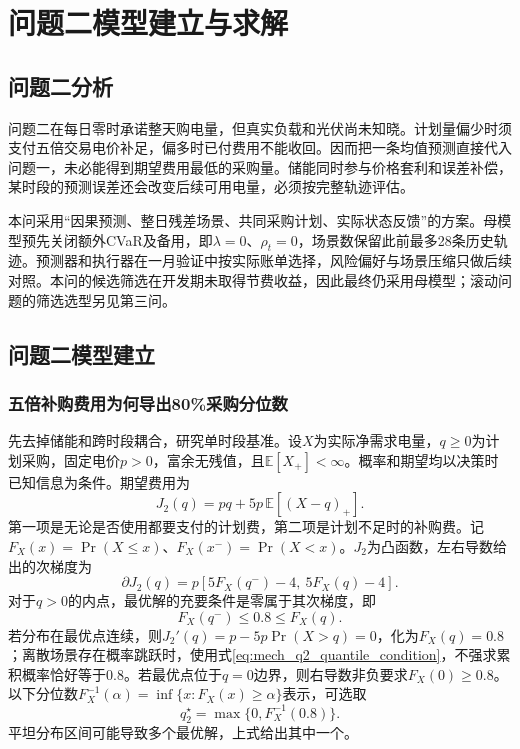 \section{问题二模型建立与求解}

\subsection{问题二分析}

问题二在每日零时承诺整天购电量，但真实负载和光伏尚未知晓。计划量偏少时须支付五倍交易电价补足，偏多时已付费用不能收回。因而把一条均值预测直接代入问题一，未必能得到期望费用最低的采购量。储能同时参与价格套利和误差补偿，某时段的预测误差还会改变后续可用电量，必须按完整轨迹评估。

本问采用“因果预测、整日残差场景、共同采购计划、实际状态反馈”的方案\cite{abunima2022,marino2018,grover2018}。母模型预先关闭额外CVaR及备用，即$\lambda=0$、$\rho_t=0$，场景数保留此前最多28条历史轨迹。预测器和执行器在一月验证中按实际账单选择，风险偏好与场景压缩只做后续对照。本问的候选筛选在开发期未取得节费收益，因此最终仍采用母模型；滚动问题的筛选选型另见第三问。

\subsection{问题二模型建立}

\subsubsection{五倍补购费用为何导出80\%采购分位数}

先去掉储能和跨时段耦合，研究单时段基准。设$X$为实际净需求电量，$q\ge0$为计划采购，固定电价$p>0$，富余无残值，且$\mathbb E[X_+]<\infty$。概率和期望均以决策时已知信息为条件。期望费用为
\begin{equation}
 J_2(q)=pq+5p\,\mathbb E[(X-q)_+].
 \label{eq:mech_q2_cost}
\end{equation}
第一项是无论是否使用都要支付的计划费，第二项是计划不足时的补购费。记$F_X(x)=\Pr(X\le x)$、$F_X(x^-)=\Pr(X<x)$。$J_2$为凸函数，左右导数给出的次梯度为
\begin{equation}
 \partial J_2(q)=p[5F_X(q^-)-4,\ 5F_X(q)-4].
 \label{eq:mech_q2_subgradient}
\end{equation}
对于$q>0$的内点，最优解的充要条件是零属于其次梯度，即
\begin{equation}
 F_X(q^-)\le0.8\le F_X(q).
 \label{eq:mech_q2_quantile_condition}
\end{equation}
若分布在最优点连续，则$J_2'(q)=p-5p\Pr(X>q)=0$，化为$F_X(q)=0.8$；离散场景存在概率跳跃时，使用式\eqref{eq:mech_q2_quantile_condition}，不强求累积概率恰好等于0.8。若最优点位于$q=0$边界，则右导数非负要求$F_X(0)\ge0.8$。以下分位数$F_X^{-1}(\alpha)=\inf\{x:F_X(x)\ge\alpha\}$表示，可选取
\begin{equation}
 q_2^\star=\max\{0,F_X^{-1}(0.8)\}.
 \label{eq:mech_q2_quantile}
\end{equation}
平坦分布区间可能导致多个最优解，上式给出其中一个。

